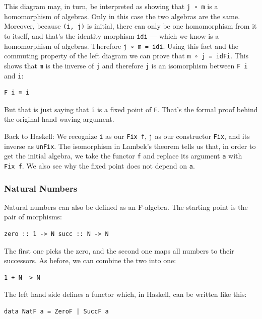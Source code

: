 This diagram may, in turn, be interpreted as showing that
\texttt{j\ ∘\ m} is a homomorphism of algebras. Only in this case the
two algebras are the same. Moreover, because \texttt{(i,\ j)} is
initial, there can only be one homomorphism from it to itself, and
that's the identity morphism \texttt{idi} --- which we know is a
homomorphism of algebras. Therefore \texttt{j\ ∘\ m\ =\ idi}. Using this
fact and the commuting property of the left diagram we can prove that
\texttt{m\ ∘\ j\ =\ idFi}. This shows that \texttt{m} is the inverse of
\texttt{j} and therefore \texttt{j} is an isomorphism between
\texttt{F\ i} and \texttt{i}:

\begin{verbatim}
F i ≅ i
\end{verbatim}

But that is just saying that \texttt{i} is a fixed point of \texttt{F}.
That's the formal proof behind the original hand-waving argument.

Back to Haskell: We recognize \texttt{i} as our \texttt{Fix\ f},
\texttt{j} as our constructor \texttt{Fix}, and its inverse as
\texttt{unFix}. The isomorphism in Lambek's theorem tells us that, in
order to get the initial algebra, we take the functor \texttt{f} and
replace its argument \texttt{a} with \texttt{Fix\ f}. We also see why
the fixed point does not depend on \texttt{a}.

\subsubsection{Natural Numbers}\label{natural-numbers}

Natural numbers can also be defined as an F-algebra. The starting point
is the pair of morphisms:

\begin{verbatim}
zero :: 1 -> N succ :: N -> N
\end{verbatim}

The first one picks the zero, and the second one maps all numbers to
their successors. As before, we can combine the two into one:

\begin{verbatim}
1 + N -> N
\end{verbatim}

The left hand side defines a functor which, in Haskell, can be written
like this:

\begin{verbatim}
data NatF a = ZeroF | SuccF a
\end{verbatim}

